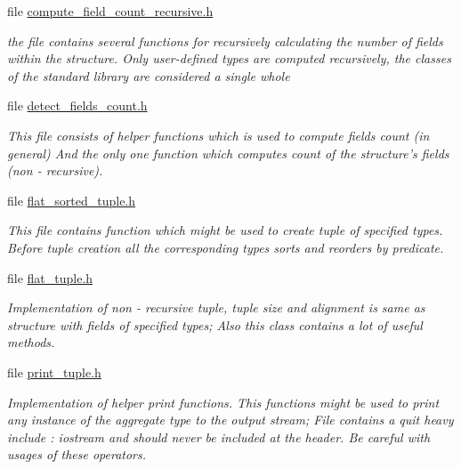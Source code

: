 \begin{CompactItemize}
\item 
file \hyperlink{compute__field__count__recursive_8h}{compute\_\-field\_\-count\_\-recursive.h}
\begin{CompactList}\small\item\em the file contains several functions for recursively calculating the number of fields within the structure. Only user-defined types are computed recursively, the classes of the standard library are considered a single whole \item\end{CompactList}

\item 
file \hyperlink{detect__fields__count_8h}{detect\_\-fields\_\-count.h}
\begin{CompactList}\small\item\em This file consists of helper functions which is used to compute fields count (in general) And the only one function which computes count of the structure's fields (non - recursive). \item\end{CompactList}

\item 
file \hyperlink{flat__sorted__tuple_8h}{flat\_\-sorted\_\-tuple.h}
\begin{CompactList}\small\item\em This file contains function which might be used to create tuple of specified types. Before tuple creation all the corresponding types sorts and reorders by predicate. \item\end{CompactList}

\item 
file \hyperlink{flat__tuple_8h}{flat\_\-tuple.h}
\begin{CompactList}\small\item\em Implementation of non - recursive tuple, tuple size and alignment is same as structure with fields of specified types; Also this class contains a lot of useful methods. \item\end{CompactList}

\item 
file \hyperlink{print__tuple_8h}{print\_\-tuple.h}
\begin{CompactList}\small\item\em Implementation of helper print functions. This functions might be used to print any instance of the aggregate type to the output stream; File contains a quit heavy include : iostream and should never be included at the header. Be careful with usages of these operators. \item\end{CompactList}

\end{CompactItemize}
